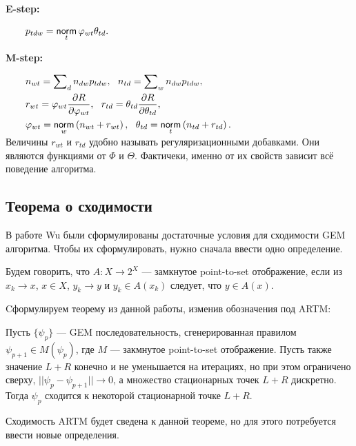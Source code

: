 \documentclass[12pt, twoside]{article}
\begin{document}
\textbf{E-step:}   
 
$
\begin{aligned}
\qquad& p_{tdw} = \mathop{\mathsf{norm}}\limits_t \varphi_{wt} \theta_{td}.
\end{aligned}
$\medskip

\textbf{M-step:}

$
\begin{aligned}    
\qquad& n_{wt} = \sum\nolimits_{d} n_{dw} p_{tdw},~~n_{td} = \sum\nolimits_{w} n_{dw} p_{tdw},\\    
\qquad& r_{wt} =  \varphi_{wt}\frac{\partial R}{\partial\varphi_{wt}},~~ r_{td} =  \theta_{td}\frac{\partial R}{\partial\theta_{td}},\\
\qquad& \varphi_{wt}  = \mathop{\mathsf{norm}}\limits_w \left(n_{wt} + r_{wt} \right),~~\theta_{td} = \mathop{\mathsf{norm}}\limits_t  \left(n_{td} + r_{td}\right).\\
\end{aligned}
$\medskip\\
Величины $r_{wt}$ и $r_{td}$ удобно называть регуляризационными добавками. Они являются функциями от $\Phi$ и $\Theta$. Фактичеки, именно от их свойств зависит всё поведение алгоритма.


\subsection{Теорема о сходимости}

 В работе Wu \cite{wuem} были сформулированы достаточные условия для сходимости GEM алгоритма. Чтобы их сформулировать, нужно сначала ввести одно определение.
\begin{Definition}
Будем говорить, что $A\colon X \to 2^X$ --- замкнутое point-to-set отображение, если из $x_k \to x$, $x \in X$, $y_k \to y$ и $y_k \in A(x_k)$ следует, что $y \in A(x)$.
\end{Definition}

Cформулируем теорему из данной работы, изменив обозначения под ARTM:
\begin{Theorem} \label{Theorem_wu} 
Пусть $\{\psi_p\}$ --- GEM последовательность, сгенерированная правилом $\psi_{p+1} \in M(\psi_p)$, где $M$ --- закмнутое point-to-set отображение. Пусть также значение $L +  R$ конечно и не уменьшается на итерациях, но при этом ограничено сверху, $|| \psi_p - \psi_{p+1}|| \to 0$, а множество стационарных точек $L +  R$ дискретно. Тогда $\psi_p$ сходится к некоторой стационарной точке $L +  R$.
\end{Theorem}

Сходимость ARTM будет сведена к данной теореме, но для этого потребуется ввести новые определения.
\end{document}
